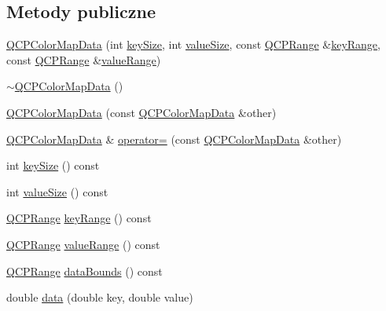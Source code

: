 \subsection*{Metody publiczne}
\begin{DoxyCompactItemize}
\item 
\hyperlink{class_q_c_p_color_map_data_aac9d8eb81e18e240d89d56c01933fd23}{Q\+C\+P\+Color\+Map\+Data} (int \hyperlink{class_q_c_p_color_map_data_aa8d7811686fdfea964947715210c4af8}{key\+Size}, int \hyperlink{class_q_c_p_color_map_data_ab880be6bc587f34e8d22fe77ef6b57e9}{value\+Size}, const \hyperlink{class_q_c_p_range}{Q\+C\+P\+Range} \&\hyperlink{class_q_c_p_color_map_data_a4765180639742460f64ab6c97c745c08}{key\+Range}, const \hyperlink{class_q_c_p_range}{Q\+C\+P\+Range} \&\hyperlink{class_q_c_p_color_map_data_a025be4d7ba0494fd7b38a5a56c737f2a}{value\+Range})
\item 
\hyperlink{class_q_c_p_color_map_data_a7ac252031d0921520d5bccb6bfa23a8b}{$\sim$\+Q\+C\+P\+Color\+Map\+Data} ()
\item 
\hyperlink{class_q_c_p_color_map_data_a7f2145d86473263494abb9bf1de20436}{Q\+C\+P\+Color\+Map\+Data} (const \hyperlink{class_q_c_p_color_map_data}{Q\+C\+P\+Color\+Map\+Data} \&other)
\item 
\hyperlink{class_q_c_p_color_map_data}{Q\+C\+P\+Color\+Map\+Data} \& \hyperlink{class_q_c_p_color_map_data_afdf4dd1b2f5714234fe84709b85c2a8d}{operator=} (const \hyperlink{class_q_c_p_color_map_data}{Q\+C\+P\+Color\+Map\+Data} \&other)
\item 
int \hyperlink{class_q_c_p_color_map_data_aa8d7811686fdfea964947715210c4af8}{key\+Size} () const 
\item 
int \hyperlink{class_q_c_p_color_map_data_ab880be6bc587f34e8d22fe77ef6b57e9}{value\+Size} () const 
\item 
\hyperlink{class_q_c_p_range}{Q\+C\+P\+Range} \hyperlink{class_q_c_p_color_map_data_a4765180639742460f64ab6c97c745c08}{key\+Range} () const 
\item 
\hyperlink{class_q_c_p_range}{Q\+C\+P\+Range} \hyperlink{class_q_c_p_color_map_data_a025be4d7ba0494fd7b38a5a56c737f2a}{value\+Range} () const 
\item 
\hyperlink{class_q_c_p_range}{Q\+C\+P\+Range} \hyperlink{class_q_c_p_color_map_data_a9ff433248ee226ea0c469ae6cc2489fd}{data\+Bounds} () const 
\item 
double \hyperlink{class_q_c_p_color_map_data_a2c33807b008cdb9e1394245c294c0eaf}{data} (double key, double value)
\item 

\end{DoxyCompactItemize}
